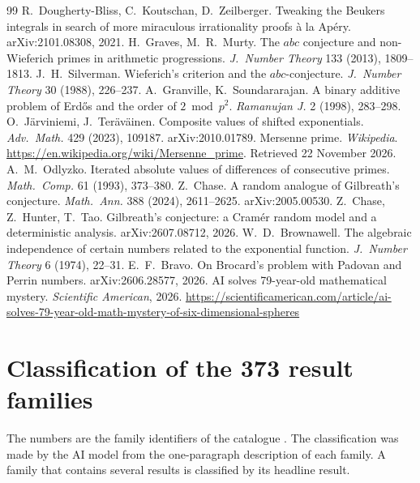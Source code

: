 \documentclass[11pt,a4paper]{article}
\theoremstyle{prob}
\begin{document}
\begin{thebibliography}{99}
 R.~Dougherty-Bliss, C.~Koutschan, D.~Zeilberger. Tweaking the Beukers integrals in search of more miraculous irrationality proofs \`a la Ap\'ery. arXiv:2101.08308, 2021.
 H.~Graves, M.~R.~Murty. The $abc$ conjecture and non-Wieferich primes in arithmetic progressions. \emph{J.\ Number Theory} 133 (2013), 1809--1813.
 J.~H.~Silverman. Wieferich's criterion and the $abc$-conjecture. \emph{J.\ Number Theory} 30 (1988), 226--237.
 A.~Granville, K.~Soundararajan. A binary additive problem of Erd\H{o}s and the order of $2 \bmod p^2$. \emph{Ramanujan J.} 2 (1998), 283--298.
 O.~J\"arviniemi, J.~Ter\"av\"ainen. Composite values of shifted exponentials. \emph{Adv.\ Math.} 429 (2023), 109187. arXiv:2010.01789.
 Mersenne prime. \emph{Wikipedia}. \url{https://en.wikipedia.org/wiki/Mersenne_prime}. Retrieved 22 November 2026.
 A.~M.~Odlyzko. Iterated absolute values of differences of consecutive primes. \emph{Math.\ Comp.} 61 (1993), 373--380.
 Z.~Chase. A random analogue of Gilbreath's conjecture. \emph{Math.\ Ann.} 388 (2024), 2611--2625. arXiv:2005.00530.
 Z.~Chase, Z.~Hunter, T.~Tao. Gilbreath's conjecture: a Cram\'er random model and a deterministic analysis. arXiv:2607.08712, 2026.
 W.~D.~Brownawell. The algebraic independence of certain numbers related to the exponential function. \emph{J.\ Number Theory} 6 (1974), 22--31.
 E.~F.~Bravo. On Brocard's problem with Padovan and Perrin numbers. arXiv:2606.28577, 2026.
 AI solves 79-year-old mathematical mystery. \emph{Scientific American}, 2026. \url{https://scientificamerican.com/article/ai-solves-79-year-old-math-mystery-of-six-dimensional-spheres}
\end{thebibliography}
\endgroup

\appendix
\section{Classification of the 373 result families}\label{app:ids}

The numbers are the family identifiers of the catalogue \cite{openairepo}. The classification was made by the AI model from the one-paragraph description of each family. A family that contains several results is classified by its headline result.
\end{document}
